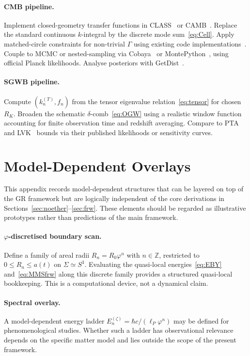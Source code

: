 \documentclass[12pt,a4paper]{article}
\newcommand{\Sig}{\Sigma}           %
\newcommand{\RK}{R_K}
\begin{document}
\paragraph{CMB pipeline.}
Implement closed-geometry transfer functions in
CLASS~\cite{CLASS2011} or CAMB~\cite{Lewis2000}. Replace
the standard continuous $k$-integral by the discrete
mode sum~\eqref{eq:Cell}. Apply matched-circle
constraints for non-trivial $\Gamma$ using existing
code implementations~\cite{CornishSpergel1998,Planck2015topology}.
Couple to MCMC or nested-sampling via Cobaya~\cite{Cobaya2021}
or MontePython~\cite{MontePython2013}, using official
Planck likelihoods. Analyse posteriors with
GetDist~\cite{GetDist2019}.

\paragraph{SGWB pipeline.}
Compute $(k_n^{(T)}, f_n)$ from the tensor eigenvalue
relation~\eqref{eq:tensor} for chosen $\RK$. Broaden
the schematic $\delta$-comb~\eqref{eq:OGW} using a
realistic window function accounting for finite
observation time and redshift averaging. Compare to
PTA~\cite{NANOGrav2023,IPTA2022} and
LVK~\cite{LVK2021} bounds via their published
likelihoods or sensitivity curves.

\section{Model-Dependent Overlays}
\label{app:model}

This appendix records model-dependent structures that can
be layered on top of the GR framework but are logically
independent of the core derivations in
Sections~\ref{sec:noether}--\ref{sec:frw}. These elements
should be regarded as illustrative prototypes rather than
predictions of the main framework.

\paragraph{$\varphi$-discretised boundary scan.}
Define a family of areal radii $R_n = R_0\varphi^n$
with $n\in\mathbb{Z}$, restricted to $0 \leq R_n \leq
a(t)$ on $\Sig \simeq S^3$. Evaluating the quasi-local
energies~\eqref{eq:EBY} and~\eqref{eq:MMSfrw} along
this discrete family provides a structured quasi-local
bookkeeping. This is a computational device, not a
dynamical claim.

\paragraph{Spectral overlay.}
A model-dependent energy ladder $E_n^{(\zeta)} =
\hbar c / (\ell_P\varphi^n)$ may be defined for
phenomenological studies. Whether such a ladder has
observational relevance depends on the specific matter
model and lies outside the scope of the present
framework.
\end{document}

